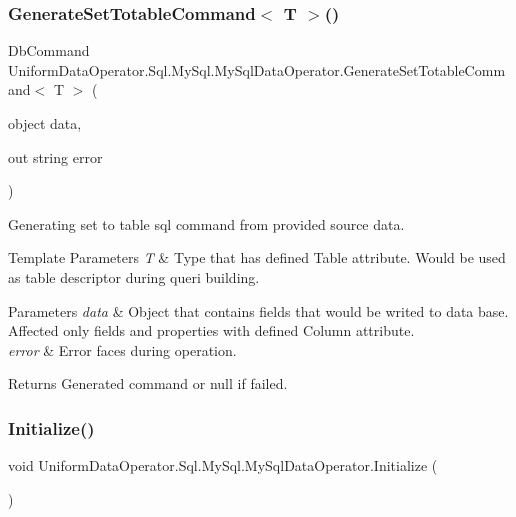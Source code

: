 \subsubsection{\texorpdfstring{Generate\+Set\+Totable\+Command$<$ T $>$()}{GenerateSetTotableCommand< T >()}}
{\footnotesize\ttfamily Db\+Command Uniform\+Data\+Operator.\+Sql.\+My\+Sql.\+My\+Sql\+Data\+Operator.\+Generate\+Set\+Totable\+Command$<$ T $>$ (\begin{DoxyParamCaption}\item[{object}]{data,  }\item[{out string}]{error }\end{DoxyParamCaption})}



Generating set to table sql command from provided source data. 


\begin{DoxyTemplParams}{Template Parameters}
{\em T} & Type that has defined Table attribute. Would be used as table descriptor during queri building.\\
\hline
\end{DoxyTemplParams}

\begin{DoxyParams}{Parameters}
{\em data} & Object that contain\textquotesingle{}s fields that would be writed to data base. Affected only fields and properties with defined Column attribute.\\
\hline
{\em error} & Error faces during operation.\\
\hline
\end{DoxyParams}
\begin{DoxyReturn}{Returns}
Generated command or null if failed.
\end{DoxyReturn}
\mbox{\label{class_uniform_data_operator_1_1_sql_1_1_my_sql_1_1_my_sql_data_operator_a5aad834d2ceba598037b6ed19b27db6d}} 
\subsubsection{\texorpdfstring{Initialize()}{Initialize()}}
{\footnotesize\ttfamily void Uniform\+Data\+Operator.\+Sql.\+My\+Sql.\+My\+Sql\+Data\+Operator.\+Initialize (\begin{DoxyParamCaption}{ }\end{DoxyParamCaption})}



